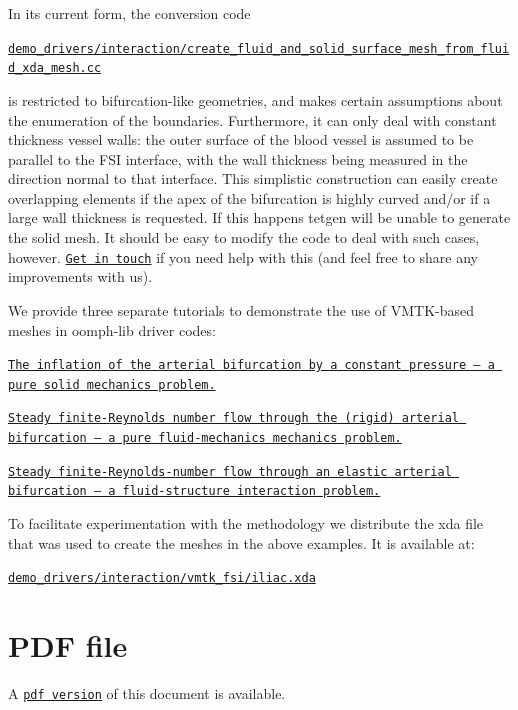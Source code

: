 \begin{DoxyItemize}
\item In its current form, the conversion code \begin{center} \href{../../../../demo_drivers/meshing/mesh_from_vmtk/create_fluid_and_solid_surface_mesh_from_fluid_xda_mesh.cc}{\tt demo\+\_\+drivers/interaction/create\+\_\+fluid\+\_\+and\+\_\+solid\+\_\+surface\+\_\+mesh\+\_\+from\+\_\+fluid\+\_\+xda\+\_\+mesh.\+cc} \end{center}  is restricted to bifurcation-\/like geometries, and makes certain assumptions about the enumeration of the boundaries. Furthermore, it can only deal with constant thickness vessel walls\+: the outer surface of the blood vessel is assumed to be parallel to the F\+SI interface, with the wall thickness being measured in the direction normal to that interface. This simplistic construction can easily create overlapping elements if the apex of the bifurcation is highly curved and/or if a large wall thickness is requested. If this happens tetgen will be unable to generate the solid mesh. It should be easy to modify the code to deal with such cases, however. \href{../../../contact/html/index.html}{\tt Get in touch} if you need help with this (and feel free to share any improvements with us).
\item We provide three separate tutorials to demonstrate the use of V\+M\+T\+K-\/based meshes in {\ttfamily oomph-\/lib} driver codes\+:
\begin{DoxyItemize}
\item \href{../../../solid/vmtk_solid/html/index.html}{\tt The inflation of the arterial bifurcation by a constant pressure -- a pure solid mechanics problem.}
\item \href{../../../navier_stokes/vmtk_fluid/html/index.html}{\tt Steady finite-\/\+Reynolds number flow through the (rigid) arterial bifurcation -- a pure fluid-\/mechanics mechanics problem.}
\item \href{../../../interaction/vmtk_fsi/html/index.html}{\tt Steady finite-\/\+Reynolds-\/number flow through an elastic arterial bifurcation -- a fluid-\/structure interaction problem.}
\end{DoxyItemize}
\item To facilitate experimentation with the methodology we distribute the {\ttfamily xda} file that was used to create the meshes in the above examples. It is available at\+: \begin{center} \href{../../../../demo_drivers/interaction/vmtk_fsi/iliac.xda}{\tt demo\+\_\+drivers/interaction/vmtk\+\_\+fsi/iliac.\+xda} \end{center} 
\end{DoxyItemize}

 

 \hypertarget{index_pdf}{}\section{P\+D\+F file}\label{index_pdf}
A \href{../latex/refman.pdf}{\tt pdf version} of this document is available. 
